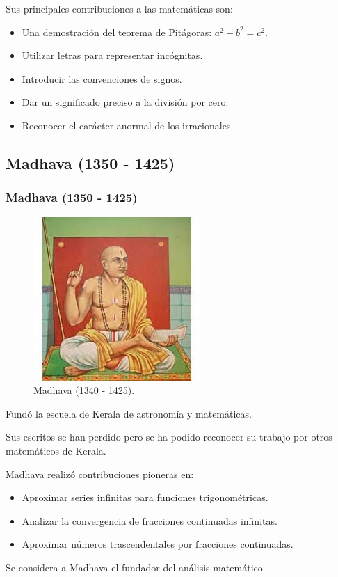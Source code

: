 \documentclass[compress, aspectratio=169]{beamer} %
\begin{document}
		\begin{frame}
			Sus principales contribuciones a las matemáticas son:
			\begin{itemize}
				\item Una demostración del teorema de Pitágoras: $a^{2}+b^{2}=c^{2}$.
				\item Utilizar letras para representar incógnitas.
				\item Introducir las convenciones de signos.
				\item Dar un significado preciso a la división por cero.
				\item Reconocer el carácter anormal de los irracionales.
			\end{itemize}
		\end{frame}
		
	\subsection{Madhava (1350 - 1425)}
		\begin{frame}
			\frametitle{Madhava (1350 - 1425)}
			\begin{figure}
				\centering
				\includegraphics[width = .35\linewidth]{madhava.jpg}
				\caption{Madhava (1340 - 1425).}
			\end{figure}
		\end{frame}

		\begin{frame}
			Fundó la escuela de Kerala de astronomía y matemáticas.
			
			Sus escritos se han perdido pero se ha podido reconocer su trabajo por otros matemáticos de Kerala.
					
			Madhava realizó contribuciones pioneras en:
			\begin{itemize}
				\item Aproximar series infinitas para funciones trigonométricas.
				\item Analizar la convergencia de fracciones continuadas infinitas.
				\item Aproximar números trascendentales por fracciones continuadas.
			\end{itemize}
	
			Se considera a Madhava el fundador del análisis matemático.
		\end{frame}
		
\end{document}
